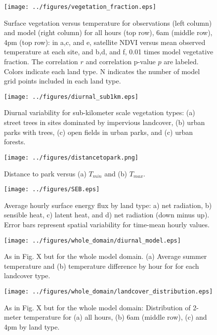 \documentclass[draft,linenumbers]{agujournal}
\begin{document}
\begin{figure}[h]
\centering
\texttt{[image: ../figures/vegetation\_fraction.eps]}
\caption{Surface vegetation versus temperature for observations (left column) and model (right column) for all hours (top row), 6am (middle row), 4pm (top row): in a,c, and e, satellite NDVI versus mean observed temperature at each site, and b,d, and f, 0.01 times model vegetative fraction. The correlation $r$ and correlation p-value $p$ are labeled. Colors indicate each land type. N indicates the number of model grid points included in each land type.}
\label{fig:veg}
\end{figure}

\begin{figure}
\centering
\texttt{[image: ../figures/diurnal\_sub1km.eps]}
\caption{Diurnal variability for sub-kilometer scale vegetation types: (a) street trees in sites dominated by impervious landcover, (b) urban parks with trees, (c) open fields in urban parks, and (c) urban forests. }
\label{fig:diurnal_urbanforests_etc}
\end{figure}

\begin{figure}
\centering
\texttt{[image: ../figures/distancetopark.png]}
\caption{Distance to park versus (a) $T_{min}$ and (b) $T_{max}$.}
\label{fig:distance to park}
\end{figure}


\begin{figure}[h]
\centering
\texttt{[image: ../figures/SEB.eps]}
\caption{Average hourly surface energy flux by land type: a) net radiation, b) sensible heat, c) latent heat, and d) net radiation (down minus up). Error bars represent spatial variability for time-mean hourly values.}
\label{fig:seb}
\end{figure}

\begin{figure}[h]
\centering
\texttt{[image: ../figures/whole\_domain/diurnal\_model.eps]}
\caption{As in Fig. X but for the whole model domain. (a) Average summer temperature and (b) temperature difference by hour for for each landcover type.}%
\label{fig:diurnal_wd}
\end{figure}

\begin{figure}[h]
\centering
\texttt{[image: ../figures/whole\_domain/landcover\_distribution.eps]}
\caption{As in Fig. X but for the whole model domain: Distribution of 2-meter temperature for (a) all hours, (b) 6am (middle row), (c) and 4pm by land type. }
\label{fig:hist_wd}
\end{figure}
\end{document}

